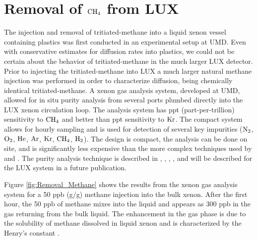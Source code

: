 \section{Removal of $\rm CH_4$ from LUX}

The injection and removal of tritiated-methane into a liquid xenon vessel containing plastics was first conducted in an experimental setup at UMD. Even with conservative estimates for diffusion rates into plastics, we could not be certain about the behavior of tritiated-methane in the much larger LUX detector. Prior to injecting the tritiated-methane into LUX a much larger natural methane injection was performed in order to characterize diffusion, being chemically identical tritiated-methane. A xenon gas analysis system, developed at UMD, allowed for in situ purity analysis from several ports plumbed directly into the LUX xenon circulation loop. The analysis system has ppt (part-per-trillion) sensitivity to $\rm CH_4$ and better than ppt sensitivity to $\rm Kr$. The compact system allows for hourly sampling and is used for detection of several key impurities ($\rm N_2$, $\rm O_2$, $\rm He$, $\rm Ar$, $\rm Kr$, $\rm CH_4$, $\rm H_2$). The design is compact, the analysis can be done on site, and is significantly less expensive than the more complex techniques used by \cite{ATTA} and \cite{Kr_ppq}. The purity analysis technique is described in \cite{coldtrap}, \cite{Dobi_CH4}, \cite{EXO_SAM}, \cite{Kr_ppt_Dobi},  and will be described for the LUX system in a future publication. %

Figure \ref{fig:Removal_Methane} shows the results from the xenon gas analysis system for a 50 ppb (g/g) methane injection into the bulk xenon. After the first hour, the 50 ppb of methane mixes into the liquid and appears as 300 ppb in the gas returning from the bulk liquid. The enhancement in the gas phase is due to the solubility of methane dissolved in liquid xenon and is characterized by the Henry's constant .

